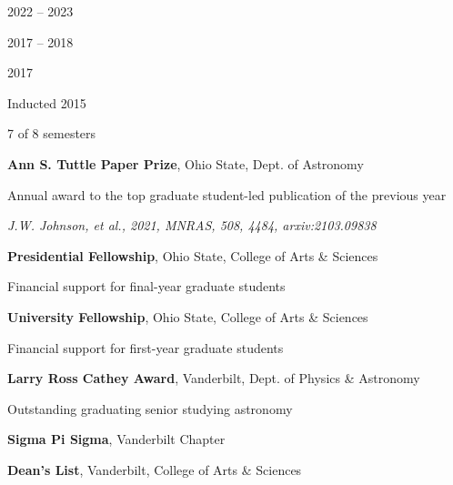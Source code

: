 \documentclass[cv.tex]{subfiles}
\begin{document}
\parbox{0.18\textwidth}{%
	 \par
	\null \par
	\null \par
	2022 -- 2023 \par
	\null \par
	2017 -- 2018 \par
	\null \par
	2017 \par
	\null \par
	Inducted 2015 \par
	7 of 8 semesters
}
\hspace{1mm}
\parbox{0.8\textwidth}{%
	\vspace{1mm}
	\textbf{Ann S. Tuttle Paper Prize}, Ohio State, Dept. of Astronomy \par
	Annual award to the top graduate student-led publication of the previous
	year \par
	\textit{J.W. Johnson, et al., 2021, MNRAS, 508, 4484, arxiv:2103.09838} \par
	\textbf{Presidential Fellowship}, Ohio State, College of Arts \& Sciences
	\par
	Financial support for final-year graduate students \par
	\textbf{University Fellowship}, Ohio State, College of Arts \& Sciences \par
	Financial support for first-year graduate students \par
	\textbf{Larry Ross Cathey Award}, Vanderbilt, Dept. of Physics \& Astronomy
	\par
	Outstanding graduating senior studying astronomy \par
	\textbf{Sigma Pi Sigma}, Vanderbilt Chapter
	\par
	\textbf{Dean's List}, Vanderbilt, College of Arts \& Sciences
}
\end{document}
